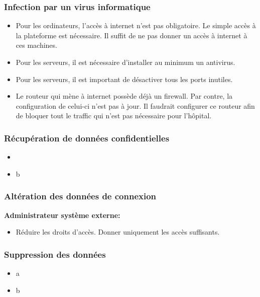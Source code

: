 \documentclass[12pt]{article}
\begin{document}
\subsubsection{Infection par un virus informatique}
\justify
\begin{itemize}
	\item Pour les ordinateurs, l'accès à internet n'est pas obligatoire. Le simple accès à la plateforme est nécessaire. Il suffit de ne pas donner un accès à internet à ces machines.
	\item Pour les serveurs, il est nécessaire d'installer au minimum un antivirus.
	\item Pour les serveurs, il est important de désactiver tous les ports inutiles.
	\item Le routeur qui mène à internet possède déjà un firewall. Par contre, la configuration de celui-ci n'est pas à jour. Il faudrait configurer ce routeur afin de bloquer tout le traffic qui n'est pas nécessaire pour l'hôpital.
\end{itemize}

\subsubsection{Récupération de données confidentielles}
\justify
\begin{itemize}
	\item 
	\item b
\end{itemize}

\subsubsection{Altération des données de connexion}
\hspace{16pt}\textbf{Administrateur système externe:}
\justify
\begin{itemize}
	\item Réduire les droits d'accès. Donner uniquement les accès suffisants.
\end{itemize}


\subsubsection{Suppression des données}
\justify
\begin{itemize}
	\item a
	\item b
\end{itemize}
\end{document}
